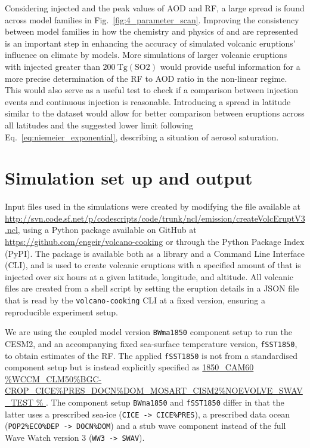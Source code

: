 \documentclass[draft]{agujournal2019}
\begin{document}
  Considering injected  and the peak values of AOD and RF, a large spread is
  found across model families in Fig.~\ref{fig:4_parameter_scan}. Improving the
  consistency between model families in how the chemistry and physics of  and
   are represented is an important step in enhancing the accuracy of simulated
  volcanic eruptions' influence on climate by models. More simulations of larger
  volcanic eruptions with injected  greater than
  \(\SI{200}{\tera\gram(\mathrm{SO2})}\) would provide useful information for a more
  precise determination of the RF to AOD ratio in the non-linear regime. This would also
  serve as a useful test to check if a comparison between  injection events and
  continuous  injection is reasonable. Introducing a spread in latitude similar
  to the  dataset would allow for better comparison between
  eruptions across all latitudes and the suggested lower limit following
  Eq.~\ref{eq:niemeier_exponential}, describing a situation of aerosol saturation.

  \appendix

  \section{Simulation set up and output}

  Input files used in the simulations were created by modifying the file available at \url{http://svn.code.sf.net/p/codescripts/code/trunk/ncl/emission/createVolcEruptV3.ncl},
  using a Python package available on GitHub at
  \url{https://github.com/engeir/volcano-cooking} or through the Python Package Index
  (PyPI). The package is available both as a library and a Command Line Interface (CLI),
  and is used to create volcanic eruptions with a specified amount of  that is
  injected over six hours at a given latitude, longitude, and altitude. All volcanic
   files are created from a shell script by setting the eruption details in a
  JSON file that is read by the \texttt{volcano-cooking} CLI at a fixed version,
  ensuring a reproducible experiment setup.

  We are using the coupled model version \texttt{BWma1850} component setup to run the
  CESM2, and an accompanying fixed sea-surface temperature version, \texttt{fSST1850},
  to obtain estimates of the RF. The applied \texttt{fSST1850} is not from a
  standardised component setup but is instead explicitly specified as \url{1850_CAM60
  }. %
  The component setup \texttt{BWma1850} and \texttt{fSST1850} differ in that the latter
  uses a prescribed sea-ice (\texttt{CICE -> CICE\%PRES}), a prescribed data ocean
  (\texttt{POP2\%ECO\%DEP -> DOCN\%DOM}) and a stub wave component instead of the full
  Wave Watch version 3 (\texttt{WW3 -> SWAV}).
\end{document}
